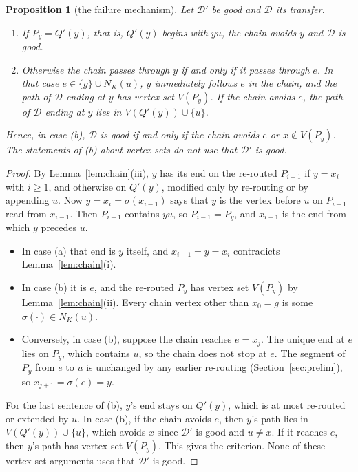 \documentclass[11pt]{amsart}
\newtheorem{proposition}[theorem]{Proposition}
\theoremstyle{definition}
\newcommand{\cD}{\mathcal D}
\begin{document}
\begin{proposition}[the failure mechanism]\label{prop:fail}
Let $\cD'$ be good and $\cD$ its transfer.
\begin{enumerate}[label=(\alph*)]
\item If $P_y=Q'(y)$, that is, $Q'(y)$ begins with $yu$, the chain avoids $y$ and $\cD$ is good.
\item Otherwise the chain passes through $y$ if and only if it passes through $e$. In that case
$e\in\{g\}\cup N_K(u)$, $y$ immediately follows $e$ in the chain, and the path of $\cD$ ending at
$y$ has vertex set $V(P_y)$. If the chain avoids $e$, the path of $\cD$ ending at $y$ lies in
$V(Q'(y))\cup\{u\}$.
\end{enumerate}
Hence, in case (b), $\cD$ is good if and only if the chain avoids $e$ or $x\notin V(P_y)$.
The statements of (b) about vertex sets do not use that $\cD'$ is good.
\end{proposition}

\begin{proof}
By Lemma~\ref{lem:chain}(iii), $y$ has its end on the re-routed $P_{i-1}$ if $y=x_i$ with $i\ge1$,
and otherwise on $Q'(y)$, modified only by re-routing or by appending $u$. Now $y=x_i=\sigma(x_{i-1})$
says that $y$ is the vertex before $u$ on $P_{i-1}$ read from $x_{i-1}$. Then $P_{i-1}$ contains $yu$,
so $P_{i-1}=P_y$, and $x_{i-1}$ is the end from which $y$ precedes $u$.
\begin{itemize}
\item In case (a) that end is $y$ itself, and $x_{i-1}=y=x_i$ contradicts Lemma~\ref{lem:chain}(i).
\item In case (b) it is $e$, and the re-routed $P_y$ has vertex set $V(P_y)$ by
Lemma~\ref{lem:chain}(ii). Every chain vertex other than $x_0=g$ is some $\sigma(\cdot)\in N_K(u)$.
\item Conversely, in case (b), suppose the chain reaches $e=x_j$. The unique end at $e$ lies on
$P_y$, which contains $u$, so the chain does not stop at $e$. The segment of $P_y$ from $e$ to $u$
is unchanged by any earlier re-routing (Section~\ref{sec:prelim}), so $x_{j+1}=\sigma(e)=y$.
\end{itemize}
For the last sentence of (b), $y$'s end stays on $Q'(y)$, which is at most re-routed or extended by
$u$. In case (b), if the chain avoids $e$, then $y$'s path lies in $V(Q'(y))\cup\{u\}$, which avoids
$x$ since $\cD'$ is good and $u\ne x$. If it reaches $e$, then $y$'s path has vertex set $V(P_y)$.
This gives the criterion. None of these vertex-set arguments uses that $\cD'$ is good.
\end{proof}
\end{document}

